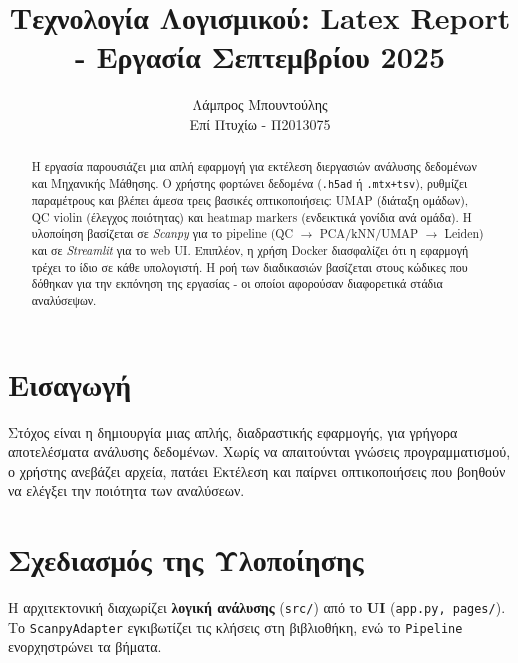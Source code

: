 \documentclass[12pt,a4paper]{article}
\title{\textbf{Τεχνολογία Λογισμικού: Latex Report - Εργασία Σεπτεμβρίου 2025}}
\author{Λάμπρος Μπουντούλης \\ Επί Πτυχίω - Π2013075}
{}
\begin{document}
\maketitle

\begin{abstract}
Η εργασία παρουσιάζει μια απλή εφαρμογή για εκτέλεση διεργασιών ανάλυσης δεδομένων και Μηχανικής Μάθησης. Ο χρήστης φορτώνει δεδομένα (\texttt{.h5ad} ή \texttt{.mtx+tsv}), ρυθμίζει παραμέτρους και βλέπει άμεσα τρεις βασικές οπτικοποιήσεις: UMAP (διάταξη ομάδων), QC violin (έλεγχος ποιότητας) και heatmap markers (ενδεικτικά γονίδια ανά ομάδα). Η υλοποίηση βασίζεται σε \textit{Scanpy} για το pipeline (QC $\to$ PCA/kNN/UMAP $\to$ Leiden) και σε \textit{Streamlit} για το web UI. Επιπλέον, η χρήση Docker διασφαλίζει ότι η εφαρμογή τρέχει το ίδιο σε κάθε υπολογιστή. Η ροή των διαδικασιών βασίζεται στους κώδικες που δόθηκαν για την εκπόνηση της εργασίας - οι οποίοι αφορούσαν διαφορετικά στάδια αναλύσεψων.
\end{abstract}

\section{Εισαγωγή}
Στόχος είναι η δημιουργία μιας απλής, διαδραστικής εφαρμογής, για γρήγορα αποτελέσματα ανάλυσης δεδομένων. Χωρίς να απαιτούνται γνώσεις προγραμματισμού, ο χρήστης ανεβάζει αρχεία, πατάει Εκτέλεση και παίρνει οπτικοποιήσεις που βοηθούν να ελέγξει την ποιότητα των αναλύσεων. 

\section{Σχεδιασμός της Υλοποίησης}
Η αρχιτεκτονική διαχωρίζει \textbf{λογική ανάλυσης} (\texttt{src/}) από το \textbf{UI} (\texttt{app.py, pages/}). Το \texttt{ScanpyAdapter} εγκιβωτίζει τις κλήσεις στη βιβλιοθήκη, ενώ το \texttt{Pipeline} ενορχηστρώνει τα βήματα.
\end{document}
